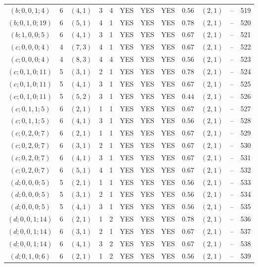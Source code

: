 \begin{longtable}{|c|c|c|c|c|c|c|c|c|c|c|c|}
$(b;0,0,1;4)$ & 6 & $(4,1)$ & 3 & 4 & YES & YES & YES & $0.56$ & $(2,1)$ & -- & 519\\
$(b;0,1,0;19)$ & 6 & $(5,1)$ & 4 & 1 & YES & YES & YES & $0.78$ & $(2,1)$ & -- & 520\\
$(b;1,0,0;5)$ & 6 & $(4,1)$ & 3 & 1 & YES & YES & YES & $0.67$ & $(2,1)$ & -- & 521\\
$(c;0,0,0;4)$ & 4 & $(7,3)$ & 4 & 1 & YES & YES & YES & $0.67$ & $(2,1)$ & -- & 522\\
$(c;0,0,0;4)$ & 4 & $(8,3)$ & 4 & 4 & YES & YES & YES & $0.56$ & $(2,1)$ & -- & 523\\
$(c;0,1,0;11)$ & 5 & $(3,1)$ & 2 & 1 & YES & YES & YES & $0.78$ & $(2,1)$ & -- & 524\\
$(c;0,1,0;11)$ & 5 & $(4,1)$ & 3 & 1 & YES & YES & YES & $0.67$ & $(2,1)$ & -- & 525\\
$(c;0,1,0;11)$ & 5 & $(5,2)$ & 3 & 1 & YES & YES & YES & $0.44$ & $(2,1)$ & -- & 526\\
$(c;0,1,1;5)$ & 6 & $(2,1)$ & 1 & 1 & YES & YES & YES & $0.67$ & $(2,1)$ & -- & 527\\
$(c;0,1,1;5)$ & 6 & $(4,1)$ & 3 & 1 & YES & YES & YES & $0.56$ & $(2,1)$ & -- & 528\\
$(c;0,2,0;7)$ & 6 & $(2,1)$ & 1 & 1 & YES & YES & YES & $0.67$ & $(2,1)$ & -- & 529\\
$(c;0,2,0;7)$ & 6 & $(3,1)$ & 2 & 1 & YES & YES & YES & $0.67$ & $(2,1)$ & -- & 530\\
$(c;0,2,0;7)$ & 6 & $(4,1)$ & 3 & 1 & YES & YES & YES & $0.67$ & $(2,1)$ & -- & 531\\
$(c;0,2,0;7)$ & 6 & $(5,1)$ & 4 & 1 & YES & YES & YES & $0.67$ & $(2,1)$ & -- & 532\\
$(d;0,0,0;5)$ & 5 & $(2,1)$ & 1 & 1 & YES & YES & YES & $0.56$ & $(2,1)$ & -- & 533\\
$(d;0,0,0;5)$ & 5 & $(3,1)$ & 2 & 1 & YES & YES & YES & $0.56$ & $(2,1)$ & -- & 534\\
$(d;0,0,0;5)$ & 5 & $(4,1)$ & 3 & 1 & YES & YES & YES & $0.56$ & $(2,1)$ & -- & 535\\
$(d;0,0,1;14)$ & 6 & $(2,1)$ & 1 & 2 & YES & YES & YES & $0.78$ & $(2,1)$ & -- & 536\\
$(d;0,0,1;14)$ & 6 & $(3,1)$ & 2 & 1 & YES & YES & YES & $0.67$ & $(2,1)$ & -- & 537\\
$(d;0,0,1;14)$ & 6 & $(4,1)$ & 3 & 2 & YES & YES & YES & $0.67$ & $(2,1)$ & -- & 538\\
$(d;0,1,0;6)$ & 6 & $(2,1)$ & 1 & 2 & YES & YES & YES & $0.56$ & $(2,1)$ & -- & 539\\

\end{longtable}
